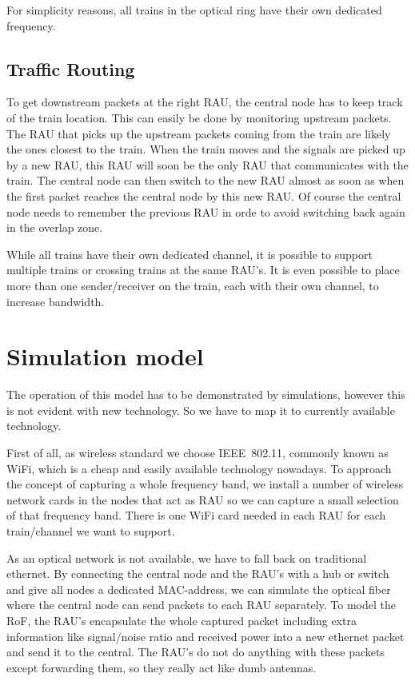 \documentclass[twocolumn]{phdsymp} %
\begin{document}
For simplicity reasons, all trains in the optical ring have their own dedicated frequency.


\subsection{Traffic Routing}
To get downstream packets at the right RAU, the central node has to keep track of the train location.  This can easily be done by monitoring upstream packets.  The RAU that picks up the upstream packets coming from the train are likely the ones closest to the train.  When the train moves and the signals are picked up by a new RAU, this RAU will soon be the only RAU that communicates with the train.  The central node can then switch to the new RAU almost as soon as when the first packet reaches the central node by this new RAU.  Of course the central node needs to remember the previous RAU in orde to avoid switching back again in the overlap zone.

While all trains have their own dedicated channel, it is possible to support multiple trains or crossing trains at the same RAU's.  It is even possible to place more than one sender/receiver on the train, each with their own channel, to increase bandwidth.


\section{Simulation model}
The operation of this model has to be demonstrated by simulations, however this is not evident with new technology.  So we have to map it to currently available technology.

First of all, as wireless standard we choose IEEE~802.11, commonly known as WiFi, which is a cheap and easily available technology nowadays.  To approach the concept of capturing a whole frequency band, we install a number of wireless network cards in the nodes that act as RAU so we can capture a small selection of that frequency band.  There is one WiFi card needed in each RAU for each train/channel we want to support.

As an optical network is not available, we have to fall back on traditional ethernet.  By connecting the central node and the RAU's with a hub or switch and give all nodes a dedicated MAC-address, we can simulate the optical fiber where the central node can send packets to each RAU separately.  To model the RoF, the RAU's encapsulate the whole captured packet including extra information like signal/noise ratio and received power into a new ethernet packet and send it to the central.  The RAU's do not do anything with these packets except forwarding them, so they really act like dumb antennas.
\end{document}
